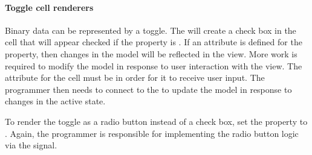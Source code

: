 \paragraph{Toggle cell renderers}

Binary data can be represented by a toggle. The
 will create a check box in the
cell that will appear checked if the  property is
. If an attribute is defined for the property, then changes
in the model will be reflected in the view. More work is required to
modify the model in response to user interaction with the view. The
 attribute for the cell must be  in order
for it to receive user input. The programmer then needs to connect to the
 to update the model in response to changes in the
active state.
\begin{Schunk}
\end{Schunk}

To render the toggle as a radio button instead of a check box, set the
 property to . Again, the programmer is
responsible for implementing the radio button logic via the
 signal.

